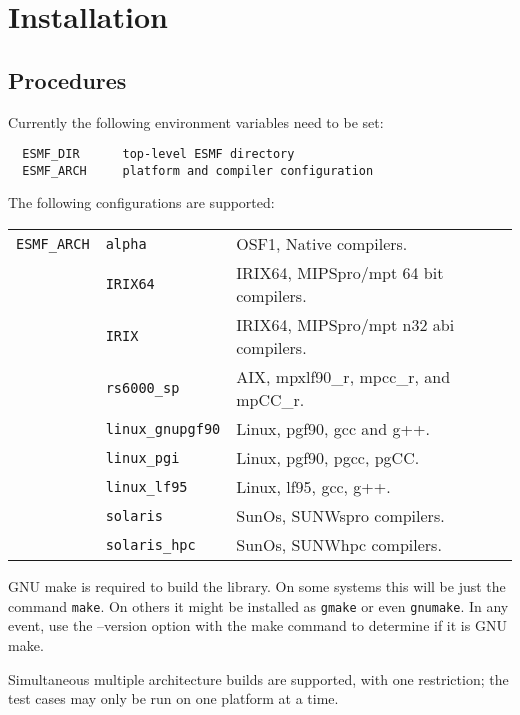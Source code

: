 
\section{Installation}

\subsection{Procedures}

Currently the following environment variables need to be set:
\begin{verbatim}
  ESMF_DIR      top-level ESMF directory
  ESMF_ARCH     platform and compiler configuration
\end{verbatim}

The following configurations are supported:

\begin{tabular}{lll}
{\tt ESMF\_ARCH}  & {\tt alpha}      &  OSF1, Native compilers. \\
                  & {\tt IRIX64}     &  IRIX64, MIPSpro/mpt 64 bit compilers. \\
                  & {\tt IRIX}       &  IRIX64, MIPSpro/mpt n32 abi compilers. \\
                  & {\tt rs6000\_sp}  &  AIX, mpxlf90\_r, mpcc\_r, and mpCC\_r.  \\
                  & {\tt linux\_gnupgf90} & Linux, pgf90, gcc and g++.  \\
                  & {\tt linux\_pgi}  &  Linux, pgf90, pgcc, pgCC. \\
                  & {\tt linux\_lf95} &  Linux, lf95, gcc, g++. \\
                  & {\tt solaris}        &  SunOs, SUNWspro compilers. \\
                  & {\tt solaris\_hpc}   &  SunOs, SUNWhpc compilers. \\
\end{tabular}


GNU make is required to build the library.  On some
systems this will be just the command \texttt{make}.  On others 
it might be installed as \texttt{gmake} or even \texttt{gnumake}.
In any event, use the --version option with the make command
to determine if it is GNU make.

Simultaneous multiple architecture builds are supported, with
one restriction; the test cases may only be run on one platform at a time. 

